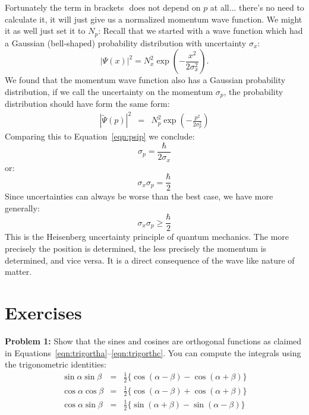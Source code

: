 \documentclass[12pt,oneside]{book}
\begin{document}
Fortunately the term in brackets ${}$ does not depend on $p$ at all... there's no need to calculate it, it will just give us a normalized momentum wave function.  We might it as well just set it to $N_p$:
Recall that we started with a wave function which had a Gaussian (bell-shaped) probability distribution with uncertainty $\sigma_x$:
\begin{displaymath}
|\Psi(x)|^2 = N_x^2 \exp\left(-\frac{x^2}{2\sigma_x^2}\right).
\end{displaymath}
We found that the momentum wave function also has a Gaussian probability distribution, if we call the uncertainty on the momentum $\sigma_p$, the probability distribution should have form the same form:
\begin{eqnarray*}
|\widetilde{\Psi}(p) |^2 &=& N_p^2 \exp\left(-\frac{p^2}{2 \sigma_p^2} \right)
\end{eqnarray*}
Comparing this to Equation~\ref{eqn:psip} we conclude:
\begin{displaymath}
\sigma_p = \frac{\hbar}{2 \sigma_x}
\end{displaymath}
or:
\begin{displaymath}
\sigma_x \sigma_p = \frac{\hbar}{2}
\end{displaymath}
Since uncertainties can always be worse than the best case, we have more generally:
\begin{displaymath}
\sigma_x \sigma_p \geq \frac{\hbar}{2}
\end{displaymath}
This is the Heisenberg uncertainty principle of quantum mechanics.  The more precisely the position is determined, the less precisely the momentum is determined, and vice versa.  It is a direct consequence of the wave like nature of matter.



\section{Exercises}

\noindent
{\bf Problem 1:} Show that the sines and cosines are orthogonal functions as claimed in Equations~\ref{eqn:trigortha}--\ref{eqn:trigorthc}.  You can compute the integrals using the trigonometric identities:
\begin{eqnarray*}
\sin \alpha \sin \beta &=& \frac{1}{2} \{\cos(\alpha - \beta) - \cos(\alpha + \beta)\}\\
\cos \alpha \cos \beta &=& \frac{1}{2} \{\cos(\alpha - \beta) + \cos(\alpha + \beta)\}\\
\cos \alpha \sin \beta &=& \frac{1}{2} \{\sin(\alpha + \beta) - \sin(\alpha - \beta)\}\\
\end{eqnarray*}
\vskip 0.5cm
\end{document}
